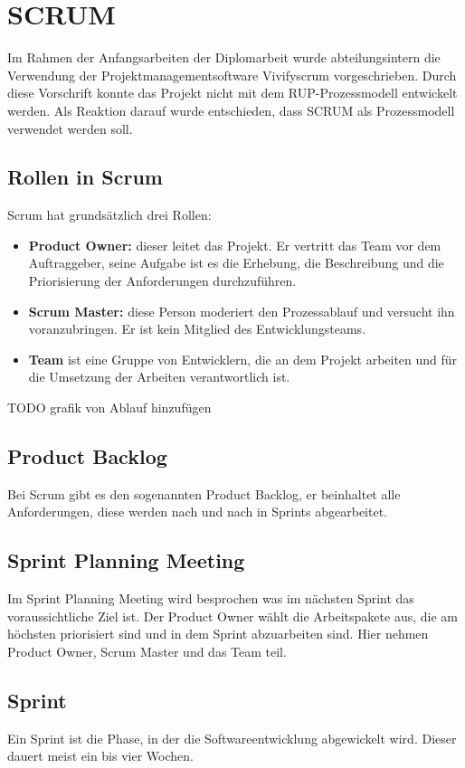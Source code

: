 	\section{SCRUM}
	
	Im Rahmen der Anfangsarbeiten der Diplomarbeit wurde abteilungsintern die Verwendung der Projektmanagementsoftware Vivifyscrum vorgeschrieben. Durch diese Vorschrift konnte das Projekt nicht mit dem RUP-Prozessmodell entwickelt werden. 
Als Reaktion darauf wurde entschieden, dass SCRUM als Prozessmodell verwendet werden soll.

		\subsection{Rollen in Scrum}
		Scrum hat grundsätzlich drei Rollen:
		
		\begin{itemize} 
			\item \textbf{Product Owner:} dieser leitet das Projekt. Er vertritt das Team vor dem Auftraggeber, seine Aufgabe ist es die Erhebung, die Beschreibung und die Priorisierung der Anforderungen durchzuführen.
			\item \textbf{Scrum Master:} diese Person moderiert den Prozessablauf und versucht ihn voranzubringen. Er ist kein Mitglied des Entwicklungsteams.
			\item \textbf{Team} ist eine Gruppe von Entwicklern, die an dem Projekt arbeiten und für die Umsetzung der Arbeiten verantwortlich ist.
		\end{itemize}
		
		TODO grafik von Ablauf hinzufügen
		
		\subsection{Product Backlog}
		Bei Scrum gibt es den sogenannten Product Backlog, er beinhaltet alle Anforderungen, diese werden nach und nach in Sprints abgearbeitet.
		\subsection{Sprint Planning Meeting}
		Im Sprint Planning Meeting wird besprochen was im nächsten Sprint das voraussichtliche Ziel ist. Der Product Owner wählt die Arbeitspakete aus, die am höchsten priorisiert sind und in dem Sprint abzuarbeiten sind. Hier nehmen Product Owner, Scrum Master und das Team teil. 
		\subsection{Sprint}
		Ein Sprint ist die Phase, in der die Softwareentwicklung abgewickelt wird. Dieser dauert meist ein bis vier Wochen. 
